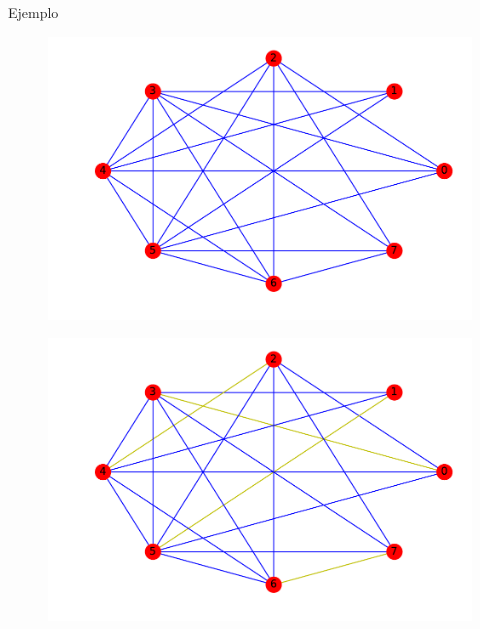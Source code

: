 \documentclass{beamer}
\begin{document}
\begin{frame}{Ejemplo}
\begin{figure}[h!]
\centering
\includegraphics[scale=0.5]{opt}
\end{figure}
\end{frame}

\begin{frame}
\begin{figure}[h!]
\centering
\includegraphics[scale=0.5]{opt2}
\end{figure}
\end{frame}
\end{document}
